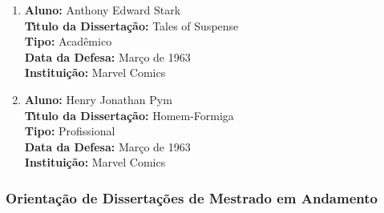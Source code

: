 \documentclass[a4paper,oneside,10pt]{article}
\begin{document}
\begin{enumerate}
\renewcommand{\labelenumi}{{\large\bfseries\arabic{enumi}.}}

\item       \textbf{Aluno:} Anthony Edward Stark \mbox{} \\
            \textbf{T\'{\i}tulo da Disserta\c{c}\~{a}o:} Tales of Suspense\\
            \textbf{Tipo:} Acadêmico \\%
            \textbf{Data da Defesa:} Março de 1963 \\
            \textbf{Institui\c{c}\~{a}o:} Marvel Comics

\item       \textbf{Aluno:} Henry Jonathan Pym \mbox{} \\
            \textbf{T\'{\i}tulo da Disserta\c{c}\~{a}o:} Homem-Formiga\\
            \textbf{Tipo:} Profissional\\
            \textbf{Data da Defesa:} Março de 1963 \\
            \textbf{Institui\c{c}\~{a}o:} Marvel Comics

\end{enumerate}


\subsubsection{Orienta\c{c}\~{a}o de Disserta\c{c}\~{o}es de Mestrado em Andamento}
\vspace{0.3cm}
\end{document}
